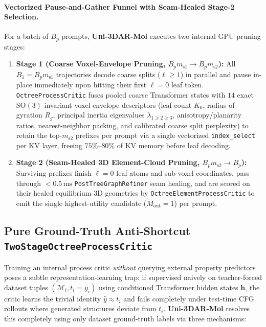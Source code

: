 \documentclass[11pt,a4paper]{article}
\begin{document}
\paragraph{Vectorized Pause-and-Gather Funnel with Seam-Healed Stage-2 Selection.}
For a batch of $B_p$ prompts, \textbf{Uni-3DAR-Mol} executes two internal GPU pruning stages:
\begin{enumerate}[leftmargin=1.6em,itemsep=2pt,topsep=2pt]
    \item \textbf{Stage 1 (Coarse Voxel-Envelope Pruning, $B_p m_{\text{s1}} \to B_p m_{\text{s2}}$):} All $B_1 = B_p m_{\text{s1}}$ trajectories decode coarse splits ($\ell \ge 1$) in parallel and pause in-place immediately upon hitting their first $\ell = 0$ leaf token. \texttt{OctreeProcessCritic} fuses pooled coarse Transformer states with $14$ exact $\text{SO}(3)$-invariant voxel-envelope descriptors (leaf count $K_0$, radius of gyration $R_g$, principal inertia eigenvalues $\lambda_{1\ge 2\ge 3}$, anisotropy/planarity ratios, nearest-neighbor packing, and calibrated coarse split perplexity) to retain the top-$m_{\text{s2}}$ prefixes per prompt via a single vectorized \texttt{index\_select} per KV layer, freeing $75\%\text{--}80\%$ of KV memory before leaf decoding.
    \item \textbf{Stage 2 (Seam-Healed 3D Element-Cloud Pruning, $B_p m_{\text{s2}} \to B_p$):} Surviving prefixes finish $\ell = 0$ leaf atoms and sub-voxel coordinates, pass through $<0.5\,\text{ms}$ \texttt{PostTree\allowbreak Graph\allowbreak Refiner} seam healing, and are scored on their healed equilibrium 3D geometries by \texttt{Octree\allowbreak Element\allowbreak ProcessCritic} to emit the single highest-utility candidate ($M_{\text{out}} = 1$) per prompt.
\end{enumerate}

\subsection{Pure Ground-Truth Anti-Shortcut \texttt{TwoStageOctreeProcessCritic}}
\label{sec:critic}

Training an internal process critic \emph{without} querying external property predictors poses a subtle representation-learning trap: if supervised naively on teacher-forced dataset tuples $(\mathcal{M}_i, t_i = y_i)$ using conditioned Transformer hidden states $\mathbf{h}$, the critic learns the trivial identity $\hat{y} \approx t_i$ and fails completely under test-time CFG rollouts where generated structures deviate from $t_i$. \textbf{Uni-3DAR-Mol} resolves this completely using only dataset ground-truth labels via three mechanisms:
\end{document}
